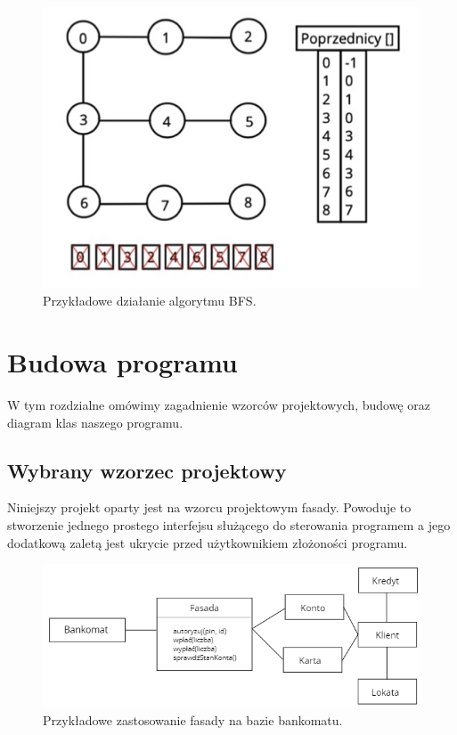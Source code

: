 \documentclass[10pt, a4paper]{report}
\begin{document}
    \begin{figure}[h]
      \begin{center}
          \includegraphics[scale=0.5]{bfs.png}
          \caption{Przykładowe działanie algorytmu BFS.}
      \end{center}
  \end{figure}
  \newpage

  \section{Budowa programu}
  W tym rozdzialne omówimy zagadnienie wzorców projektowych, budowę oraz diagram klas naszego programu.

    \subsection{Wybrany wzorzec projektowy}
    Niniejszy projekt oparty jest na wzorcu projektowym fasady.
    Powoduje to stworzenie jednego prostego interfejsu służącego do sterowania programem
    a jego dodatkową zaletą jest ukrycie przed użytkownikiem złożoności programu.

    \begin{figure}[h]
      \begin{center}
          \includegraphics[scale=0.42]{facede.png}
          \caption{Przykładowe zastosowanie fasady na bazie bankomatu.}
      \end{center}
    \end{figure}
    \newpage
\end{document}
